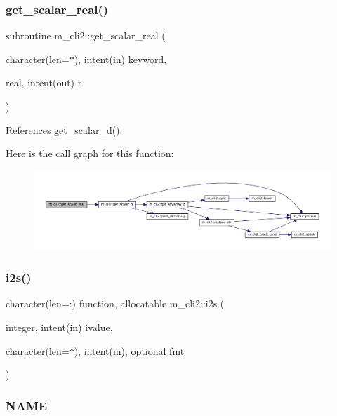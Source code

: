 \subsubsection{\texorpdfstring{get\+\_\+scalar\+\_\+real()}{get\_scalar\_real()}}
{\footnotesize\ttfamily subroutine m\+\_\+cli2\+::get\+\_\+scalar\+\_\+real (\begin{DoxyParamCaption}\item[{character(len=$\ast$), intent(in)}]{keyword,  }\item[{real, intent(out)}]{r }\end{DoxyParamCaption})\hspace{0.3cm}{\ttfamily [private]}}



References get\+\_\+scalar\+\_\+d().

Here is the call graph for this function\+:\nopagebreak
\begin{figure}[H]
\begin{center}
\leavevmode
\includegraphics[width=350pt]{namespacem__cli2_ad089d91c66626de91bcda84523e80b54_cgraph}
\end{center}
\end{figure}
\mbox{\label{namespacem__cli2_aa106d3533fd6d4845f0b3e94b2a79ffb}} 
\subsubsection{\texorpdfstring{i2s()}{i2s()}}
{\footnotesize\ttfamily character(len=\+:) function, allocatable m\+\_\+cli2\+::i2s (\begin{DoxyParamCaption}\item[{integer, intent(in)}]{ivalue,  }\item[{character(len=$\ast$), intent(in), optional}]{fmt }\end{DoxyParamCaption})\hspace{0.3cm}{\ttfamily [private]}}



\subsubsection*{N\+A\+ME}

